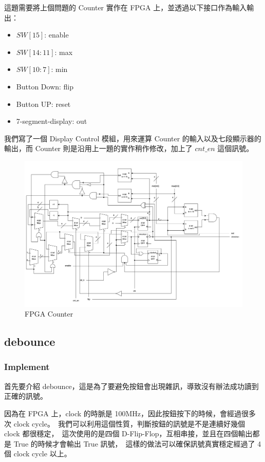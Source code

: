 \documentclass[10.5pt,compsoc,UTF8]{CjC}
\theoremstyle{mystyle}
\begin{document}
這題需要將上個問題的 Counter 實作在 FPGA 上，並透過以下接口作為輸入輸出：
\begin{itemize}
  \item $SW[15]$: enable
  \item $SW[14:11]$: max
  \item $SW[10:7]$: min
  \item Button Down: flip
  \item Button UP: reset
  \item 7-segment-display: out
\end{itemize}


我們寫了一個 Display Control 模組，用來運算 Counter 的輸入以及七段顯示器的輸出，而 Counter 則是沿用上一題的實作稍作修改，加上了 $cnt\_en$ 這個訊號。

\begin{figure}[!h]
  \centering
  \includegraphics[width=\textwidth]{./img/FPGA.png}
  \caption{FPGA Counter}
  \label{fig:FPGA}
\end{figure}

\newpage

\subsection{debounce}
\subsubsection*{Implement}
首先要介紹 debounce，這是為了要避免按鈕會出現雜訊，導致沒有辦法成功讀到正確的訊號。\
\par
因為在 FPGA 上，clock 的時脈是 100MHz，因此按鈕按下的時候，會經過很多次 clock cycle。\
我們可以利用這個性質，判斷按鈕的訊號是不是連續好幾個 clock 都很穩定，\
這次使用的是四個 D-Flip-Flop，互相串接，並且在四個輸出都是 True 的時候才會輸出 True 訊號，\
這樣的做法可以確保訊號真實穩定經過了 4 個 clock cycle 以上。
\end{document}
